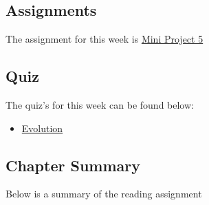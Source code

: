 \subsection{Assignments}

The assignment for this week is \href{https://applied.cs.colorado.edu/mod/assign/view.php?id=49453}{Mini Project 5}  

\subsection{Quiz}

The quiz's for this week can be found below:

\begin{itemize}
    \item \href{https://applied.cs.colorado.edu/mod/quiz/view.php?id=49449}{Evolution}  
\end{itemize}

\subsection{Chapter Summary}

Below is a summary of the reading assignment